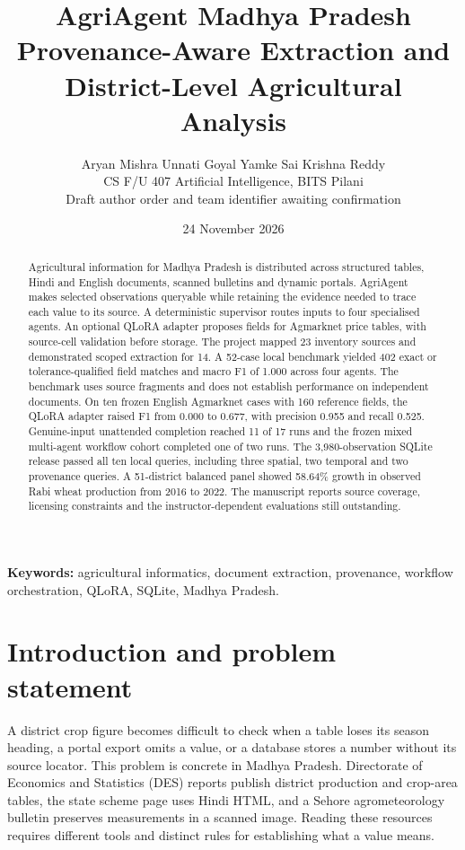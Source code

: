 \documentclass[11pt,a4paper]{article}
\title{\vspace{-1.3em}\textbf{AgriAgent Madhya Pradesh}\\[4pt]
\large Provenance-Aware Extraction and District-Level Agricultural Analysis}
\author{Aryan Mishra \quad Unnati Goyal \quad Yamke Sai Krishna Reddy\\
\small CS F/U 407 Artificial Intelligence, BITS Pilani\\
\small Draft author order and team identifier awaiting confirmation}
\date{24 November 2026}
\begin{document}
\maketitle
\vspace{-1em}
\begin{abstract}
Agricultural information for Madhya Pradesh is distributed across structured tables, Hindi and English documents, scanned bulletins and dynamic portals. AgriAgent makes selected observations queryable while retaining the evidence needed to trace each value to its source. A deterministic supervisor routes inputs to four specialised agents. An optional QLoRA adapter proposes fields for Agmarknet price tables, with source-cell validation before storage. The project mapped 23 inventory sources and demonstrated scoped extraction for 14. A 52-case local benchmark yielded 402 exact or tolerance-qualified field matches and macro F1 of 1.000 across four agents. The benchmark uses source fragments and does not establish performance on independent documents. On ten frozen English Agmarknet cases with 160 reference fields, the QLoRA adapter raised F1 from 0.000 to 0.677, with precision 0.955 and recall 0.525. Genuine-input unattended completion reached 11 of 17 runs and the frozen mixed multi-agent workflow cohort completed one of two runs. The 3,980-observation SQLite release passed all ten local queries, including three spatial, two temporal and two provenance queries. A 51-district balanced panel showed 58.64\% growth in observed Rabi wheat production from 2016 to 2022. The manuscript reports source coverage, licensing constraints and the instructor-dependent evaluations still outstanding.
\end{abstract}

\textbf{Keywords:} agricultural informatics, document extraction, provenance, workflow orchestration, QLoRA, SQLite, Madhya Pradesh.

\section{Introduction and problem statement}
A district crop figure becomes difficult to check when a table loses its season heading, a portal export omits a value, or a database stores a number without its source locator. This problem is concrete in Madhya Pradesh. Directorate of Economics and Statistics (DES) reports publish district production and crop-area tables, the state scheme page uses Hindi HTML, and a Sehore agrometeorology bulletin preserves measurements in a scanned image. Reading these resources requires different tools and distinct rules for establishing what a value means.
\end{document}
